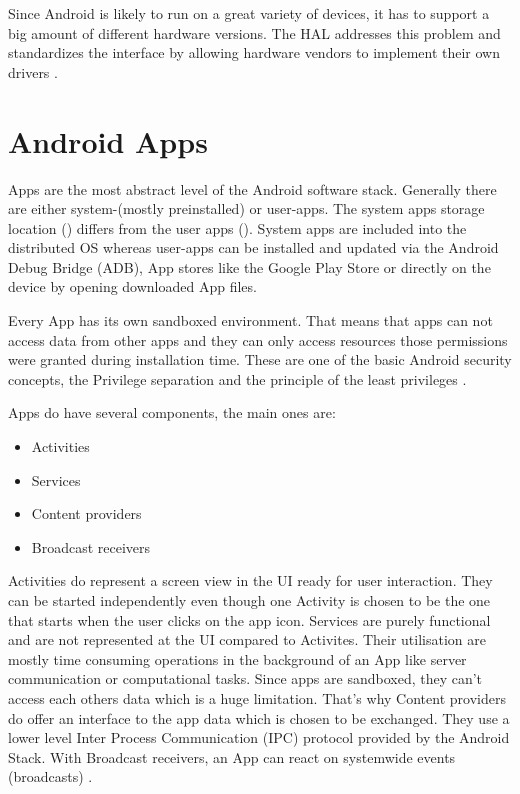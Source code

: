 Since Android is likely to run on a great variety of devices,
it has to support a big amount of different hardware versions.
The HAL addresses this problem and
standardizes the interface by allowing hardware vendors
to implement their own drivers \parencite[p.18f]{levin}.

\section{Android Apps}\label{section:android_apps}
Apps are the most abstract level of the Android software stack.
Generally there are either system-(mostly preinstalled) or user-apps.
The system apps storage location () differs from
the user apps (). System apps are included into the
distributed OS whereas user-apps can be installed and updated
via the Android Debug Bridge (ADB), App stores
like the Google Play Store or directly on the device by opening
downloaded App files.

Every App has its own sandboxed environment. That means that
apps can not access data from other apps and they can only access
resources those permissions were granted during installation time.
These are one of the basic Android security concepts,
the Privilege separation and the principle of the least
privileges \parencite[ch.1]{securityinternals}.

Apps do have several components, the main ones are:

\begin{itemize}
\item Activities
\item Services
\item Content providers
\item Broadcast receivers
\end{itemize}

Activities do represent a screen view in the UI ready for user
interaction. They can be started independently even though one Activity
is chosen to be the one that starts when the user clicks on the
app icon. Services are purely functional and are not represented
at the UI compared to Activites. Their utilisation are mostly time
consuming operations in the background of an App like server
communication or computational tasks. Since apps are sandboxed,
they can't access each others data which is a huge limitation.
That's why Content providers do offer an interface to the app
data which is chosen to be exchanged.
They use a lower level Inter Process Communication (IPC) protocol
provided by the Android Stack.
With Broadcast receivers, an App can react on systemwide events
(broadcasts) \parencite[ch.1]{securityinternals}.

